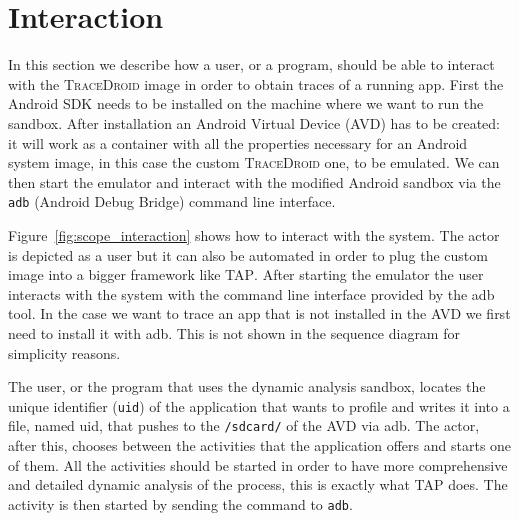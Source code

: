 \section{Interaction}
\label{sec:scope_interaction}

In this section we describe how a user, or a program, should be able
to interact with the \textsc{TraceDroid} image in order to obtain traces of a
running app. First the Android SDK needs to be installed on the
machine where we want to run the sandbox. After installation an
Android Virtual Device (AVD) has to be created: it will work as a
container with all the properties necessary for an Android system
image, in this case the custom \textsc{TraceDroid} one, to be emulated. We can
then start the emulator and interact with the modified Android sandbox
via the \texttt{adb} (Android Debug Bridge) command line interface.

Figure~\ref{fig:scope_interaction} shows how to interact with the system. The actor is
depicted as a user but it can also be automated in order to plug the
custom image into a bigger framework like \textsc{TAP}. After starting the
emulator the user interacts with the system with the command line
interface provided by the adb tool. In the case we want to trace an
app that is not installed in the AVD we first need to install it with
adb. This is not shown in the sequence diagram for simplicity reasons.

The user, or the program that uses the dynamic analysis sandbox,
locates the unique identifier (\texttt{uid}) of the application that wants to
profile and writes it into a file, named uid, that pushes to the
\texttt{/sdcard/} of the AVD via adb. The actor, after this, chooses between the
activities that the application offers and starts one of them. All the
activities should be started in order to have more comprehensive and
detailed dynamic analysis of the process, this is exactly what \textsc{TAP}
does. The activity is then started by sending the command to \texttt{adb}.

